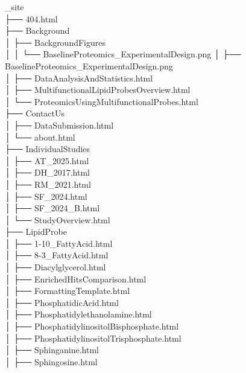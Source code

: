 \documentclass[
  letterpaper,
  DIV=11,
  numbers=noendperiod]{scrartcl}
\begin{document}
\begin{tcolorbox}[enhanced jigsaw, bottomtitle=1mm, coltitle=black, arc=.35mm, rightrule=.15mm, colback=white, breakable, colbacktitle=quarto-callout-note-color!10!white, colframe=quarto-callout-note-color-frame, bottomrule=.15mm, title=\textcolor{quarto-callout-note-color}{\faInfo}\hspace{0.5em}{Note}, toprule=.15mm, opacitybacktitle=0.6, toptitle=1mm, titlerule=0mm, left=2mm, leftrule=.75mm, opacityback=0]

\_site\\
├── 404.html\\
├── Background\\
│ ├── BackgroundFigures\\
│ │ └── BaselineProteomics\_ExperimentalDesign.png │ ├──
BaselineProteomics\_ExperimentalDesign.png\\
│ ├── DataAnalysisAndStatistics.html\\
│ ├── MultifunctionalLipidProbesOverview.html\\
│ └── ProteomicsUsingMultifunctionalProbes.html\\
├── ContactUs\\
│ ├── DataSubmission.html\\
│ └── about.html\\
├── IndividualStudies\\
│ ├── AT\_2025.html\\
│ ├── DH\_2017.html\\
│ ├── RM\_2021.html\\
│ ├── SF\_2024.html\\
│ ├── SF\_2024\_B.html\\
│ └── StudyOverview.html\\
├── LipidProbe\\
│ ├── 1-10\_FattyAcid.html\\
│ ├── 8-3\_FattyAcid.html\\
│ ├── Diacylglycerol.html\\
│ ├── EnrichedHitsComparison.html\\
│ ├── FormattingTemplate.html\\
│ ├── PhosphatidicAcid.html\\
│ ├── Phosphatidylethanolamine.html\\
│ ├── PhosphatidylinositolBisphosphate.html\\
│ ├── PhosphatidylinositolTrisphosphate.html\\
│ ├── Sphinganine.html\\
│ ├── Sphingosine.html\\

\end{tcolorbox}
\end{document}
